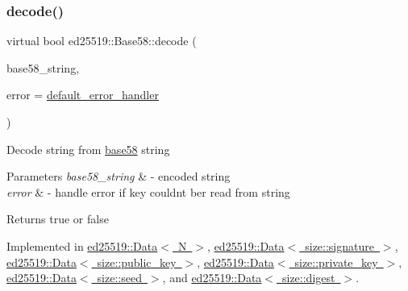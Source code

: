 \subsubsection{\texorpdfstring{decode()}{decode()}}
{\footnotesize\ttfamily virtual bool ed25519\+::\+Base58\+::decode (\begin{DoxyParamCaption}\item[{const std\+::string \&}]{base58\+\_\+string,  }\item[{const \mbox{\hyperlink{namespaceed25519_a6ba572942b3c18591fc869d52a6b16e6}{Error\+Handler}} \&}]{error = {\ttfamily \mbox{\hyperlink{namespaceed25519_a7c7bb6ed17541162959c33ed3e3b15fb}{default\+\_\+error\+\_\+handler}}} }\end{DoxyParamCaption})\hspace{0.3cm}{\ttfamily [pure virtual]}}

Decode string from \mbox{\hyperlink{namespaceed25519_1_1base58}{base58}} string


\begin{DoxyParams}{Parameters}
{\em base58\+\_\+string} & -\/ encoded string \\
\hline
{\em error} & -\/ handle error if key couldn\textquotesingle{}t ber read from string \\
\hline
\end{DoxyParams}
\begin{DoxyReturn}{Returns}
true or false 
\end{DoxyReturn}


Implemented in \mbox{\hyperlink{classed25519_1_1_data_a281d932d3c3fe7fd40ce86ea7eff559b}{ed25519\+::\+Data$<$ N $>$}}, \mbox{\hyperlink{classed25519_1_1_data_a281d932d3c3fe7fd40ce86ea7eff559b}{ed25519\+::\+Data$<$ size\+::signature $>$}}, \mbox{\hyperlink{classed25519_1_1_data_a281d932d3c3fe7fd40ce86ea7eff559b}{ed25519\+::\+Data$<$ size\+::public\+\_\+key $>$}}, \mbox{\hyperlink{classed25519_1_1_data_a281d932d3c3fe7fd40ce86ea7eff559b}{ed25519\+::\+Data$<$ size\+::private\+\_\+key $>$}}, \mbox{\hyperlink{classed25519_1_1_data_a281d932d3c3fe7fd40ce86ea7eff559b}{ed25519\+::\+Data$<$ size\+::seed $>$}}, and \mbox{\hyperlink{classed25519_1_1_data_a281d932d3c3fe7fd40ce86ea7eff559b}{ed25519\+::\+Data$<$ size\+::digest $>$}}.

\mbox{\label{classed25519_1_1_base58_a1b52a018a5215e2dcf2aa388b0fe06bf}} 
